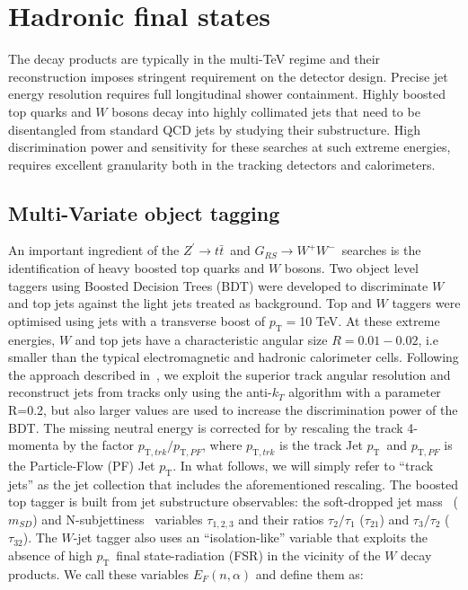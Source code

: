 \documentclass[a4paper,11pt]{article}
\newcommand*{\Zptt}{\ensuremath{Z^{\prime} \rightarrow \ttbar}}
\newcommand{\ptSub}[1]{\ensuremath{p_{\text{T} #1}}}
\newcommand{\pt}{\ensuremath{p_{\text{T}}}}
\newcommand{\mSD}{\ensuremath{m_{\ensuremath{SD}}}}
\newcommand*{\rsg}{\ensuremath{G_{RS} \rightarrow W^+W^-}}
\newcommand*{\ttbar}{\ensuremath{t\bar{t}}}
\begin{document}
\section{Hadronic final states}
\label{sec:hadronic}

The decay products are typically in the multi-TeV regime and their reconstruction imposes stringent requirement on the detector design. Precise jet energy resolution requires full longitudinal shower containment. Highly boosted top quarks and $W$ bosons decay into highly collimated jets that need to  be disentangled from standard QCD jets by studying their substructure. High discrimination power and sensitivity for these searches at such extreme energies, requires excellent granularity both in the tracking detectors and calorimeters.

\subsection{Multi-Variate object tagging}
\label{subsec:mvatagger}

An important ingredient of the \Zptt\ and \rsg\ searches is the identification of heavy boosted top quarks and $W$ bosons. Two object level taggers using Boosted Decision Trees (BDT) were developed to discriminate $W$ and top jets against the light jets treated as background.
Top and $W$ taggers were optimised using jets with a transverse boost of $\pt=$10 TeV. At these extreme energies, $W$ and top jets have a characteristic angular size $R=0.01-0.02$, i.e smaller than the typical electromagnetic and hadronic calorimeter cells. Following the approach described in~\cite{Larkoski:2015yqa}, we exploit the superior track angular resolution and reconstruct jets from tracks only using the anti-$k_T$ algorithm with a parameter R=0.2, but also larger values are used to increase the discrimination power of the BDT. The missing neutral energy is corrected for by rescaling the track 4-momenta by the factor $\ptSub{,trk}/\ptSub{,PF}$, where $\ptSub{,trk}$ is the track Jet \pt\ and $\ptSub{,PF}$ is the Particle-Flow (PF) Jet \pt. In what follows, we will simply refer to ``track jets'' as the jet collection that includes the aforementioned rescaling.
\newline
The boosted top tagger is built from jet substructure observables: the soft-dropped jet mass~\cite{Larkoski:2014wba} (\mSD) and N-subjettiness~\cite{Thaler:2010tr} variables $\tau_{1,2,3}$ and their ratios $\tau_{2}/\tau_{1}$ ($\tau_{21}$) and $\tau_{3}/\tau_{2}$ ($\tau_{32}$). The $W$-jet tagger also uses an ``isolation-like'' variable that exploits the absence of high \pt\ final state-radiation (FSR) in the vicinity of the $W$ decay products. We call these variables $E_{F}(n,\alpha)$ and define them as:
\end{document}

